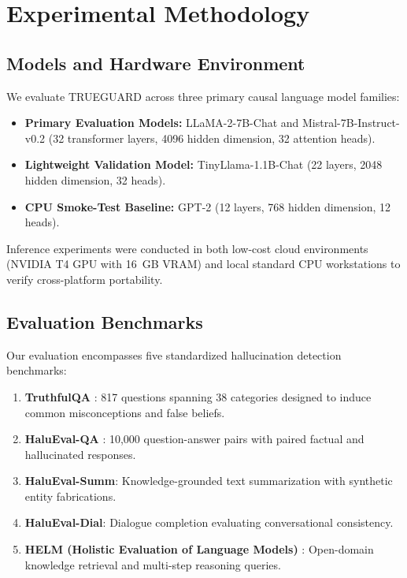 \documentclass[journal]{IEEEtran}
\begin{document}
\section{Experimental Methodology}
\subsection{Models and Hardware Environment}
We evaluate TRUEGUARD across three primary causal language model families:
\begin{itemize}
    \item \textbf{Primary Evaluation Models:} LLaMA-2-7B-Chat \cite{touvron2023llama} and Mistral-7B-Instruct-v0.2 \cite{jiang2023mistral} (32 transformer layers, 4096 hidden dimension, 32 attention heads).
    \item \textbf{Lightweight Validation Model:} TinyLlama-1.1B-Chat \cite{zhang2024tinyllama} (22 layers, 2048 hidden dimension, 32 heads).
    \item \textbf{CPU Smoke-Test Baseline:} GPT-2 (12 layers, 768 hidden dimension, 12 heads).
\end{itemize}

Inference experiments were conducted in both low-cost cloud environments (NVIDIA T4 GPU with 16~GB VRAM) and local standard CPU workstations to verify cross-platform portability.

\subsection{Evaluation Benchmarks}
Our evaluation encompasses five standardized hallucination detection benchmarks:
\begin{enumerate}
    \item \textbf{TruthfulQA} \cite{lin2022truthfulqa}: 817 questions spanning 38 categories designed to induce common misconceptions and false beliefs.
    \item \textbf{HaluEval-QA} \cite{li2023halueval}: 10,000 question-answer pairs with paired factual and hallucinated responses.
    \item \textbf{HaluEval-Summ}: Knowledge-grounded text summarization with synthetic entity fabrications.
    \item \textbf{HaluEval-Dial}: Dialogue completion evaluating conversational consistency.
    \item \textbf{HELM (Holistic Evaluation of Language Models)} \cite{liang2022holistic}: Open-domain knowledge retrieval and multi-step reasoning queries.
\end{enumerate}
\end{document}
